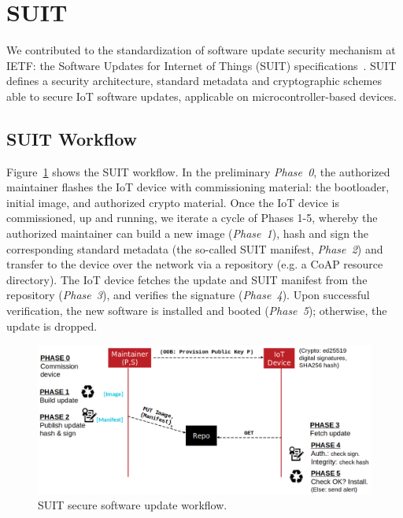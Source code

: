 \documentclass[../main.tex]{subfiles}
\begin{document}
	

	\section{SUIT}
	

We contributed to the standardization of software update security mechanism at IETF: the Software Updates for Internet of Things (SUIT) specifications~\cite{ietf2022suit}.
SUIT defines a security architecture, standard metadata and cryptographic schemes able to secure IoT software updates, applicable on microcontroller-based devices.

\subsection{SUIT Workflow}
\label{sec:suit-workflow}

Figure~\ref{fig:suit-workflow}
shows the SUIT workflow.
In the preliminary \emph{Phase~0},
the authorized maintainer %
flashes the IoT device with commissioning material: the bootloader, initial image, and authorized crypto material.
Once the IoT device is commissioned, up and running,
we iterate a cycle of Phases 1-5, whereby the authorized maintainer can
build a new image (\emph{Phase~1}), hash and sign the corresponding
standard metadata (the so-called SUIT manifest, \emph{Phase~2}) and
transfer to the device over the network via a repository (e.g. a CoAP
resource directory). The IoT device fetches the update and
SUIT manifest from the repository (\emph{Phase~3}),
and verifies the signature (\emph{Phase~4}).
Upon successful verification, the new software is installed and booted
(\emph{Phase~5}); otherwise, the update is dropped.


\begin{figure}[t!]
		\centering
		\includegraphics[width=\linewidth]{images/SUIT-workflow.png}
		\caption{SUIT secure software update workflow.}
		\label{fig:suit-workflow}
	\end{figure}
\end{document}
